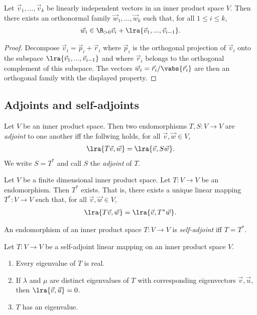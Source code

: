 \documentclass{article}
\begin{document}
\begin{theorem}[Notes 5.2.7]
	Let $\vec v_1,...,\vec v_k$ be linearly independent vectors in an inner product space $V$. Then 
	there exists an orthonormal family $\vec w_1,...,\vec w_k$ such that, for all $1\leq i\leq k$,
	\begin{align*}
		\vec w_i\in \R_{>0}\vec v_i + \lra{\vec v_1,...,\vec v_{i-1}}.	
	\end{align*}
	\begin{proof}
		Decompose $\vec v_i=\vec p_i+\vec r_i$ where $\vec p_i$ is the orthogonal projection of $\vec v_i$
		onto the subspace $\lra{\vec v_1,...,\vec v_{i-1}}$ and where $\vec r_i$ belongs to the orthogonal
		complement of this subspace. The vectors $\vec w_i=\vec r_i/\vabs{\vec r_i}$ are then an orthogonal
		family with the displayed property.
	\end{proof}
\end{theorem}

\subsection{Adjoints and self-adjoints}

\begin{definition}
	Let $V$ be an inner product space. Then two endomorphisms $T,S:V\to V$ are \emph{adjoint}
	to one another iff the follwing holds, for all $\vec v, \vec w\in V$,
	\begin{align*}
		\lra{T\vec v,\vec w}=\lra{\vec v, S\vec w}.
	\end{align*}
	We write $S=T^*$ and call $S$ the \emph{adjoint} of $T$.
\end{definition}

\begin{theorem}[Notes 5.3.4]
	Let $V$ be a finite dimensional inner product space. Let $T:V\to V$ be an endomorphism. Then $T^*$
	exists. That is, there exists a unique linear mapping $T^*:V\to V$ such that, for all $\vec v,\vec w\in V$,	
	\begin{align*}
		\lra{T\vec v,\vec w}=\lra{\vec v, T^*\vec w}.
	\end{align*}
\end{theorem}

\begin{definition}
	An endomorphism of an inner product space $T:V\to V$ is \emph{self-adjoint} iff $T=T^*$.
\end{definition}

\begin{theorem}[Notes 5.3.7]
	Let $T:V\to V$ be a self-adjoint linear mapping on an inner product space $V$.
	\begin{enumerate}
		\item Every eigenvalue of $T$ is real.
		\item If $\lambda$ and $\mu$ are distinct eigenvalues of $T$ with corresponding eigenvectors
			$\vec v,\vec u$, then $\lra{\vec v,\vec u}=0$.
		\item $T$ has an eigenvalue.
	\end{enumerate}	
\end{theorem}
\end{document}
